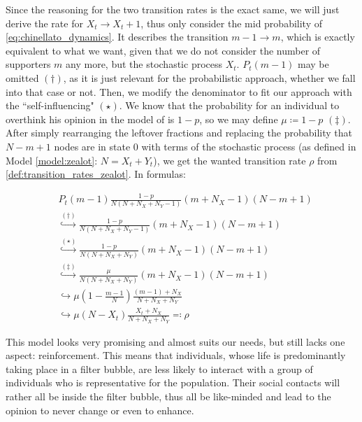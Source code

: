 \documentclass[12pt,a4paper,twoside]{article}
\begin{document}
Since the reasoning for the two transition rates is the exact same, we will just derive the rate for $X_t \rightarrow X_t + 1$, thus only consider the mid probability of \eqref{eq:chinellato_dynamics}. It describes the transition $m -1 \rightarrow m$, which is exactly equivalent to what we want, given that we do not consider the number of supporters $m$ any more, but the stochastic process $X_t$. $P_t \left(m-1\right)$ may be omitted $(\dagger)$, as it is just relevant for the probabilistic approach, whether we fall into that case or not. Then, we modify the denominator to fit our approach with the ``self-influencing" $(\star)$. We know that the probability for an individual to overthink his opinion in the model of \cite{Aguiar2011, Chinellato2015} is $1-p$, so we may define $\mu \coloneqq 1-p$ $(\ddagger)$. After simply rearranging the leftover fractions and replacing the probability that $N - m + 1$ nodes are in state $0$ with terms of the stochastic process (as defined in Model \ref{model:zealot}: $N = X_t + Y_t$), we get the wanted transition rate $\rho$ from \eqref{def:transition_rates_zealot}. In formulas:

\begin{align*}
	&P_t\left(m-1\right)\frac{1-p}{N\left(N+N_X+N_Y-1\right)}\left(m+N_X-1\right)\left(N-m+1\right)\\
	&\overset{(\dagger)}{\hookrightarrow} \frac{1-p}{N\left(N+N_X+N_Y-1\right)}\left(m+N_X-1\right)\left(N-m+1\right)\\
	&\overset{(\star)}{\hookrightarrow} \frac{1-p}{N(N+N_X+N_Y)}\left(m+N_X-1\right)\left(N-m+1\right)\\
	&\overset{(\ddagger)}{\hookrightarrow} \frac{\mu}{N(N+N_X+N_Y)}\left(m+N_X-1\right)\left(N-m+1\right)\\
	&\hookrightarrow \mu \left(1-\frac{m-1}{N}\right)\frac{\left(m-1\right) + N_X}{N + N_X + N_Y}\\
	&\hookrightarrow \mu\left(N-X_t\right)\frac{X_t + N_X}{N + N_X + N_Y} \eqqcolon \rho
\end{align*}

This model looks very promising and almost suits our needs, but still lacks one aspect: reinforcement. This means that individuals, whose life is predominantly taking place in a filter bubble, are less likely to interact with a group of individuals who is representative for the population. Their social contacts will rather all be inside the filter bubble, thus all be like-minded and lead to the opinion to never change or even to enhance.\newline
\end{document}
